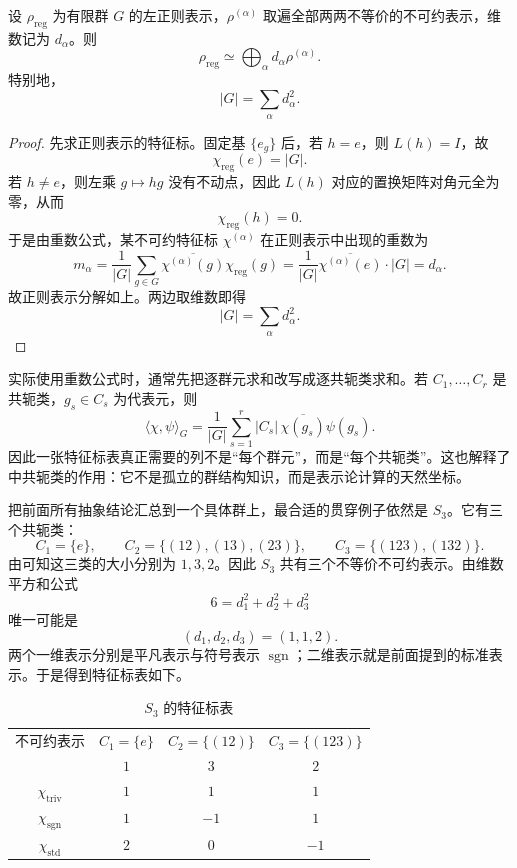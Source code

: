\begin{corollary}[正则表示的分解与维数平方和公式]
设 $\rho_{\mathrm{reg}}$ 为有限群 $G$ 的左正则表示，$\rho^{(\alpha)}$ 取遍全部两两不等价的不可约表示，维数记为 $d_\alpha$。则
\[
\rho_{\mathrm{reg}}\simeq \bigoplus_\alpha d_\alpha\rho^{(\alpha)}.
\]
特别地，
\[
|G|=\sum_\alpha d_\alpha^2.
\]
\label{cor:regular-decomposition}

\end{corollary}

\begin{proof}
先求正则表示的特征标。固定基 $\{e_g\}$ 后，若 $h=e$，则 $L(h)=I$，故
\[
\chi_{\mathrm{reg}}(e)=|G|.
\]
若 $h\neq e$，则左乘 $g\mapsto hg$ 没有不动点，因此 $L(h)$ 对应的置换矩阵对角元全为零，从而
\[
\chi_{\mathrm{reg}}(h)=0.
\]
于是由重数公式，某不可约特征标 $\chi^{(\alpha)}$ 在正则表示中出现的重数为
\[
m_\alpha
=\frac1{|G|}\sum_{g\in G}\overline{\chi^{(\alpha)}(g)}\chi_{\mathrm{reg}}(g)
=\frac1{|G|}\overline{\chi^{(\alpha)}(e)}\cdot |G|
=d_\alpha.
\]
故正则表示分解如上。两边取维数即得
\[
|G|=\sum_\alpha d_\alpha^2.
\]
\end{proof}

实际使用重数公式时，通常先把逐群元求和改写成逐共轭类求和。若 $C_1,\dots,C_r$ 是共轭类，$g_s\in C_s$ 为代表元，则
\[
\langle\chi,\psi\rangle_G
=\frac1{|G|}\sum_{s=1}^r |C_s|\,\overline{\chi(g_s)}\psi(g_s).
\]
因此一张特征标表真正需要的列不是“每个群元”，而是“每个共轭类”。这也解释了 中共轭类的作用：它不是孤立的群结构知识，而是表示论计算的天然坐标。

把前面所有抽象结论汇总到一个具体群上，最合适的贯穿例子依然是 $S_3$。它有三个共轭类：
\[
C_1=\{e\},\qquad C_2=\{(12),(13),(23)\},\qquad C_3=\{(123),(132)\}.
\]
由可知这三类的大小分别为 $1,3,2$。因此 $S_3$ 共有三个不等价不可约表示。由维数平方和公式
\[
6=d_1^2+d_2^2+d_3^2
\]
唯一可能是
\[
(d_1,d_2,d_3)=(1,1,2).
\]
两个一维表示分别是平凡表示与符号表示 $\operatorname{sgn}$；二维表示就是前面提到的标准表示。于是得到特征标表如下。

\begin{table}[htbp]
\centering
\caption{$S_3$ 的特征标表}
\label{tab:s3-character-table}
\begin{tabular}{c|ccc}
\toprule
不可约表示 & $C_1=\{e\}$ & $C_2=\{(12)\}$ & $C_3=\{(123)\}$ \\
& $1$ & $3$ & $2$ \\
\midrule
$\chi_{\mathrm{triv}}$ & $1$ & $1$ & $1$ \\
$\chi_{\mathrm{sgn}}$ & $1$ & $-1$ & $1$ \\
$\chi_{\mathrm{std}}$ & $2$ & $0$ & $-1$ \\
\bottomrule
\end{tabular}
\end{table}

